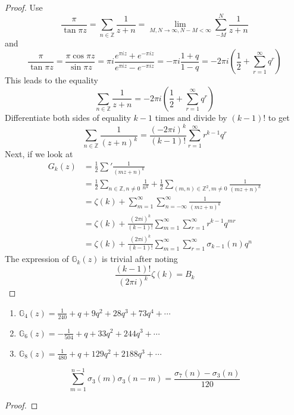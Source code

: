 \documentclass[oneside, 12pt, ]{scrbook}
\newcommand{\ZZ}{\mathbb Z}
\theoremstyle{theorem}
\begin{document}
\begin{proof}
Use $$\frac{\pi}{\tan \pi z} = \sum_{n \in \ZZ} \frac{1}{z+n} = \lim_{M,N \rightarrow \infty , N-M < \infty} \sum_{-M}^{N} \frac{1}{z+n}$$ and 
$$\frac{\pi}{\tan \pi z} = \frac{\pi \cos \pi z}{\sin \pi z} = \pi i \frac{e^{\pi i z} + e^{-\pi i z}}{e^{\pi i z} - e^{-\pi i z}} = - \pi i \frac{1+q}{1-q} = - 2 \pi i \left( \frac{1}{2} + \sum_{r=1}^{\infty} q^r \right)$$ This leads to the equality 
$$\sum_{n\in \ZZ}\frac{1}{z+n} = -  2 \pi i \left( \frac{1}{2} + \sum_{r=1}^{\infty} q^r \right)$$
Differentiate both sides of equality $k-1$ times and divide by $(k-1)!$ to get $$\sum_{n \in \ZZ}\frac{1}{(z+n)^k} = \frac{(-2 \pi i)^k}{(k-1)!} \sum_{r=1}^{\infty} r^{k-1}q^r$$
Next, if we look at 
\begin{align*}
G_{k}(z) &= \frac{1}{2} \sum' \frac{1}{(mz+n)^k} \\
&= \frac{1}{2} \sum_{n \in \ZZ , n \neq 0} \frac{1}{n^k} + \frac{1}{2} \sum_{(m,n) \in \ZZ^2 , m \neq 0} \frac{1}{(mz + n)^k} \\
&= \zeta(k) + \sum_{m=1}^{\infty} \sum_{n=-\infty}^{\infty} \frac{1}{(mz+n)^k} \\
&= \zeta(k) + \frac{(2 \pi i)^k}{(k-1)!} \sum_{m=1}^{\infty} \sum_{r=1}^{\infty} r^{k-1} q^{mr} \\
&= \zeta(k) + \frac{(2 \pi i)^k}{(k-1)!} \sum_{m=1}^{\infty} \sum_{r=1}^{\infty} \sigma_{k-1}(n) q^{n}
\end{align*}
The expression of $\mathbb{G}_{k}(z)$ is trivial after noting $$\frac{(k-1)!}{(2 \pi i)^k} \zeta(k) = B_{k}$$
\end{proof} 

\begin{remark}
\begin{enumerate}
\item $\mathbb{G}_{4}(z) = \frac{1}{240} + q + 9q^2 + 28q^3 + 73q^4 + \cdots $
\item $\mathbb{G}_{6}(z) = -\frac{1}{504} + q + 33q^2 + 244q^3 + \cdots $
\item $\mathbb{G}_{8}(z) = \frac{1}{480} + q + 129q^2 + 2188q^3 + \cdots $
\end{enumerate}
\end{remark}

\begin{proposition}
$$\sum_{m=1}^{n-1} \sigma_{3}(m) \sigma_{3}(n-m) = \frac{\sigma_{7}(n) - \sigma_{3}(n)}{120}$$
\end{proposition}

\begin{proof}

\end{proof}
\end{document}
